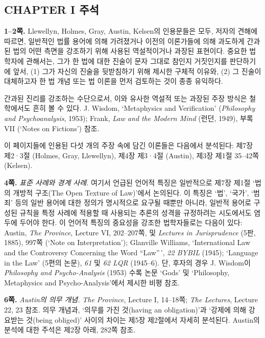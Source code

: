 \documentclass[12pt, oneside]{book}  %
\begin{document}
\subsection{\texorpdfstring{\textbf{CHAPTER I
주석}}{CHAPTER I 주석}}\label{chapter-i-uxc8fcuxc11d}

\textbf{1--2쪽.} Llewellyn, Holmes, Gray, Austin, Kelsen의 인용문들은
모두, 저자의 견해에 따르면, 일반적인 법률 용어에 의해 가려졌거나 이전의
이론가들에 의해 과도하게 간과된 법의 어떤 측면을 강조하기 위해 사용된
역설적이거나 과장된 표현이다. 중요한 법학자에 관해서는, 그가 한 법에
대한 진술이 문자 그대로 참인지 거짓인지를 판단하기에 앞서, (1) 그가
자신의 진술을 뒷받침하기 위해 제시한 구체적 이유와, (2) 그 진술이
대체하고자 한 법 개념 또는 법 이론을 먼저 검토하는 것이 종종 유익하다.

간과된 진리를 강조하는 수단으로서, 이와 유사한 역설적 또는 과장된 주장
방식은 철학에서도 흔히 볼 수 있다. J. Wisdom, `Metaphysics and
Verification' (\emph{Philosophy and Psychoanalysis}, 1953); Frank,
\emph{Law and the Modern Mind} (런던, 1949), 부록 VII (`Notes on
Fictions') 참조.

이 페이지들에 인용된 다섯 개의 주장 속에 담긴 이론들은 다음에서
분석된다: 제7장 제2·3절 (Holmes, Gray, Llewellyn), 제4장 제3·4절
(Austin), 제3장 제1절 35--42쪽 (Kelsen).

\textbf{4쪽.} \emph{표준 사례와 경계 사례.} 여기서 언급된 언어적 특징은
일반적으로 제7장 제1절 `법의 개방적 구조(The Open Texture of Law)'에서
논의된다. 이 특징은 `법', `국가', `범죄' 등의 일반 용어에 대한 정의가
명시적으로 요구될 때뿐만 아니라, 일반적 용어로 구성된 규칙을 특정 사례에
적용할 때 사용되는 추론의 성격을 규정하려는 시도에서도 염두에 두어야
한다. 이 언어적 특징의 중요성을 강조한 법학자들로는 다음이 있다: Austin,
\emph{The Province}, Lecture VI, 202--207쪽, 및 \emph{Lectures in
Jurisprudence} (5판, 1885), 997쪽 (`Note on Interpretation'); Glanville
Williams, `International Law and the Controversy Concerning the Word
``Law''\,', \emph{22 BYBIL} (1945); `Language in the Law' (5편의 논문),
\emph{61} 및 \emph{62 LQR} (1945--6). 단, 후자의 경우 J. Wisdom이
\emph{Philosophy and Psycho-Analysis} (1953) 수록 논문 `Gods' 및
`Philosophy, Metaphysics and Psycho-Analysis'에서 제시한 비평 참조.

\textbf{6쪽.} \emph{Austin의 의무 개념.} \emph{The Province}, Lecture I,
14--18쪽; \emph{The Lectures}, Lecture 22, 23 참조. 의무 개념과, `의무를
가진 것(having an obligation)'과 `강제에 의해 강요받는 것(being
obliged)' 사이의 차이는 제5장 제2절에서 자세히 분석된다. Austin의 분석에
대한 주석은 제2장 아래, 282쪽 참조.
\end{document}
